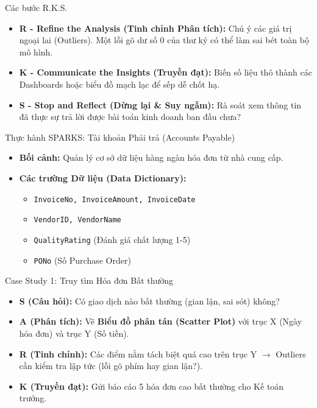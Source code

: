 \documentclass[aspectratio=169,12pt]{beamer}
\begin{document}
\begin{frame}{Các bước R.K.S.}
    \begin{itemize}
        \item \textbf{R - Refine the Analysis (Tinh chỉnh Phân tích):} Chú ý các giá trị ngoại lai (Outliers). Một lỗi gõ dư số 0 của thư ký có thể làm sai bét toàn bộ mô hình.
        \item \textbf{K - Communicate the Insights (Truyền đạt):} Biến số liệu thô thành các Dashboards hoặc biểu đồ mạch lạc để sếp dễ chốt hạ.
        \item \textbf{S - Stop and Reflect (Dừng lại \& Suy ngẫm):} Rà soát xem thông tin đã thực sự trả lời được bài toán kinh doanh ban đầu chưa?
    \end{itemize}
\end{frame}

\begin{frame}{Thực hành SPARKS: Tài khoản Phải trả (Accounts Payable)}
    \begin{itemize}
        \item \textbf{Bối cảnh:} Quản lý cơ sở dữ liệu hàng ngàn hóa đơn từ nhà cung cấp.
        \item \textbf{Các trường Dữ liệu (Data Dictionary):}
        \begin{itemize}
            \item \texttt{InvoiceNo, InvoiceAmount, InvoiceDate}
            \item \texttt{VendorID, VendorName}
            \item \texttt{QualityRating} (Đánh giá chất lượng 1-5)
            \item \texttt{PONo} (Số Purchase Order)
        \end{itemize}
    \end{itemize}
\end{frame}

\begin{frame}{Case Study 1: Truy tìm Hóa đơn Bất thường}
    \begin{itemize}
        \item \textbf{S (Câu hỏi):} Có giao dịch nào bất thường (gian lận, sai sót) không?
        \item \textbf{A (Phân tích):} Vẽ \textbf{Biểu đồ phân tán (Scatter Plot)} với trục X (Ngày hóa đơn) và trục Y (Số tiền).
        \item \textbf{R (Tinh chỉnh):} Các điểm nằm tách biệt quá cao trên trục Y $\rightarrow$ Outliers cần kiểm tra lập tức (lỗi gõ phím hay gian lận?).
        \item \textbf{K (Truyền đạt):} Gửi báo cáo 5 hóa đơn cao bất thường cho Kế toán trưởng.
    \end{itemize}
\end{frame}
\end{document}
